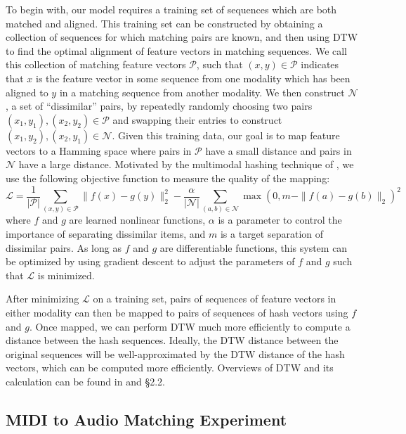 \documentclass{article} %
\begin{document}
To begin with, our model requires a training set of sequences which are both matched and aligned.
This training set can be constructed by obtaining a collection of sequences for which matching pairs are known, and then using DTW to find the optimal alignment of feature vectors in matching sequences.
We call this collection of matching feature vectors $\mathcal{P}$, such that $(x, y) \in \mathcal{P}$ indicates that $x$ is the feature vector in some sequence from one modality which has been aligned to $y$ in a matching sequence from another modality.
We then construct $\mathcal{N}$, a set of ``dissimilar'' pairs, by repeatedly randomly choosing two pairs $(x_1, y_1), (x_2, y_2) \in \mathcal{P}$ and swapping their entries to construct $(x_1, y_2), (x_2, y_1) \in \mathcal{N}$.
Given this training data, our goal is to map feature vectors to a Hamming space where pairs in $\mathcal{P}$ have a small distance and pairs in $\mathcal{N}$ have a large distance.
Motivated by the multimodal hashing technique of \cite{masci2014multimodal}, we use the following objective function to measure the quality of the mapping:
\begin{equation*}
\mathcal{L} = \frac{1}{|\mathcal{P}|} \sum_{(x, y) \in \mathcal{P}} \| f(x) - g(y) \|_2^2  - \frac{\alpha}{|\mathcal{N}|} \sum_{(a, b) \in \mathcal{N}} \max(0, m - \|f(a) - g(b) \|_2)^2
\end{equation*}
where $f$ and $g$ are learned nonlinear functions, $\alpha$ is a parameter to control the importance of separating dissimilar items, and $m$ is a target separation of dissimilar pairs.
As long as $f$ and $g$ are differentiable functions, this system can be optimized by using gradient descent to adjust the parameters of $f$ and $g$ such that $\mathcal{L}$ is minimized.

After minimizing $\mathcal{L}$ on a training set, pairs of sequences of feature vectors in either modality can then be mapped to pairs of sequences of hash vectors using $f$ and $g$.
Once mapped, we can perform DTW much more efficiently to compute a distance between the hash sequences.
Ideally, the DTW distance between the original sequences will be well-approximated by the DTW distance of the hash vectors, which can be computed more efficiently.
Overviews of DTW and its calculation can be found in \cite{muller2007dynamic, rakthanmanon2012searching} and \cite{raffel2015large} \S 2.2.

\subsection{MIDI to Audio Matching Experiment}
\end{document}
